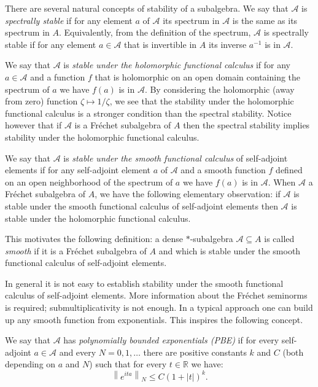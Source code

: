 \documentclass[12pt,reqno]{amsart}
\numberwithin{equation}{section}
\newcommand{\R}{{\mathbb R}}
\begin{document}
There are several natural concepts of stability of a subalgebra. We say that $\mathcal{A}$ is {\it spectrally stable} if for any element $a$ of $\mathcal{A}$ its spectrum in $\mathcal{A}$ is the same as its spectrum in $A$. Equivalently, from the definition of the spectrum, $\mathcal{A}$ is spectrally stable if for any element $a\in \mathcal{A}$ that is invertible in $A$ its inverse $a^{-1}$ is in $\mathcal{A}$.

We say that $\mathcal{A}$ is {\it stable under the holomorphic functional calculus} if for any $a\in \mathcal{A}$ and a function $f$ that is holomorphic on an open domain containing the spectrum of $a$ we have $f(a)$ is in $\mathcal{A}$. By considering the holomorphic (away from zero) function $\zeta\mapsto 1/\zeta$, we see that the stability under the holomorphic functional calculus is a stronger condition than the spectral stability. Notice however that if $\mathcal{A}$ is a Fr\'echet subalgebra of $A$ then the spectral stability implies stability under the holomorphic functional calculus.

We say that $\mathcal{A}$ is {\it stable under the smooth functional calculus} of self-adjoint elements if for any self-adjoint element $a$ of $\mathcal{A}$ and a smooth function $f$ defined on an open neighborhood of the spectrum of $a$ we have $f(a)$ is in $\mathcal{A}$. When  $\mathcal{A}$ a Fr\'echet subalgebra of $A$, we have the following elementary observation:
if $\mathcal{A}$ is stable under the smooth functional calculus of self-adjoint elements then $\mathcal{A}$ is stable under the holomorphic functional calculus.

This motivates the following definition: a  dense $*$-subalgebra $\mathcal{A}\subseteq A$ is called {\it smooth} if it is a Fr\'echet subalgebra of $A$ and which is stable under the smooth functional calculus of self-adjoint elements.

In general it is not easy to establish stability under the smooth functional calculus of self-adjoint elements. More information about the Fr\'echet seminorms is required; submultiplicativity is not enough. In a typical approach one can build up any smooth function from exponentials.
This inspires the following concept.
 
We say that $\mathcal{A}$ has {\it polynomially bounded exponentials (PBE)}  if for every self-adjoint $a\in\mathcal{A}$ and every $N=0,1,\ldots$ there are  positive constants $k$ and  $C$ (both depending on $a$ and $N$) such that for every $t\in\R$ we have:
\begin{equation*}
\left\| e^{ita}\right\|_N\leq C(1+|t|)^k.
\end{equation*}
\end{document}
